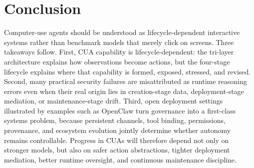 \section{Conclusion}
\label{sec:conclusion}

Computer-use agents should be understood as lifecycle-dependent interactive systems rather than benchmark models that merely click on screens. Three takeaways follow. First, CUA capability is lifecycle-dependent: the tri-layer architecture explains how observations become actions, but the four-stage lifecycle explains where that capability is formed, exposed, stressed, and revised. Second, many practical security failures are misattributed as runtime reasoning errors even when their real origin lies in creation-stage data, deployment-stage mediation, or maintenance-stage drift. Third, open deployment settings illustrated by examples such as OpenClaw turn governance into a first-class systems problem, because persistent channels, tool binding, permissions, provenance, and ecosystem evolution jointly determine whether autonomy remains controllable. Progress in CUAs will therefore depend not only on stronger models, but also on safer action abstractions, tighter deployment mediation, better runtime oversight, and continuous maintenance discipline.

